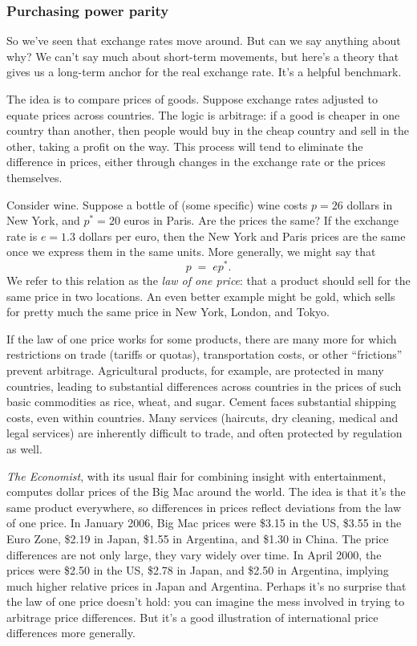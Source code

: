 \documentclass[letterpaper,12pt]{article}
\begin{document}
\subsubsection*{Purchasing power parity}

So we've seen that exchange rates move around.
But can we say anything about why?
We can't say much about short-term movements, 
but here's a theory that gives us a long-term anchor
for the real exchange rate.  
It's a helpful benchmark.  

The idea is to compare prices of goods.
Suppose exchange rates adjusted to equate prices across countries.
The logic is arbitrage:  if a good is cheaper in one
country than another, then people would buy in the cheap country
and sell in the other, taking a profit on the way.
This process will tend to eliminate the difference in prices, 
either through changes in the exchange rate or the prices themselves.  

Consider wine.
Suppose a bottle of (some specific) wine costs $p=26$ dollars in New York,
and $p^*=20$ euros in Paris.
Are the prices the same?
If the exchange rate is $e=1.3$ dollars per euro,
then the New York and Paris prices are the same once we express them
in the same units.
More generally, we might say that
\begin{equation}
    p \;=\; e p^* .
\end{equation}
We refer to this relation as the {\it law of one price\/}:
that a product should sell for the same price in two locations.
An even better example might be gold,
which sells for pretty much the same price in
New York, London, and Tokyo.

If the law of one price works for some products,
there are many more for which restrictions on
trade (tariffs or quotas), transportation costs,
or other ``frictions'' prevent arbitrage.
Agricultural products, for example, are protected in many countries,
leading to substantial differences across countries
in the prices of such basic commodities as rice, wheat, and sugar.
Cement faces substantial shipping costs, even within countries.
Many services (haircuts, dry cleaning, medical and legal services)
are inherently difficult to trade,
and often protected by regulation as well.

{\it The Economist\/}, with its usual flair for combining insight
with entertainment, computes dollar prices of the Big Mac around the
world.
The idea is that it's the same product everywhere, so differences
in prices reflect deviations from the law of one price.
In January 2006, Big Mac prices were \$3.15 in the US,
\$3.55 in the Euro Zone, \$2.19 in Japan, \$1.55 in Argentina,
and \$1.30 in China. The price differences are not only large, they vary
widely over time. In April 2000, the prices were \$2.50 in the US,
\$2.78 in Japan, and \$2.50 in Argentina, implying much higher
relative prices in Japan and Argentina.
Perhaps it's no surprise that the law of one price doesn't hold:
you can imagine the mess involved in trying to arbitrage price
differences.
But it's a good illustration of international price differences
more generally.
\end{document}
